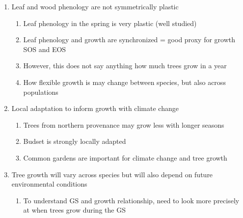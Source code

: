 \documentclass{article}\usepackage[]{graphicx}\usepackage[]{xcolor}
\begin{document}
\begin{enumerate}
\begin{enumerate}
  \item Competition may offset extra days to grow especially for below canopy trees
  
  \item Length and speed of growth is physiologically (or genetically?) controlled
  
  \item And how much phenology can track these changing conditions matters
  
  \end{enumerate}

\item Leaf and wood phenology are not symmetrically plastic
  \begin{enumerate}
  
  \item Leaf phenology in the spring is very plastic (well studied)
  
  \item Leaf phenology and growth are synchronized = good proxy for growth SOS and EOS
  
  \item However, this does not say anything how much trees grow in a year
  
  \item How flexible growth is may change between species, but also across populations
  \end{enumerate}

\item Local adaptation to inform growth with climate change
  \begin{enumerate}
  
  \item Trees from northern provenance may grow less with longer seasons
  
  \item Budset is strongly locally adapted
  
  \item Common gardens are important for climate change and tree growth
  
  \end{enumerate}

\item Tree growth will vary across species but will also depend on future environmental conditions   %
  \begin{enumerate}
  \item To understand GS and growth relationship, need to look more precisely at when trees grow during the GS
  

\end{enumerate}
\end{enumerate}
\end{document}
